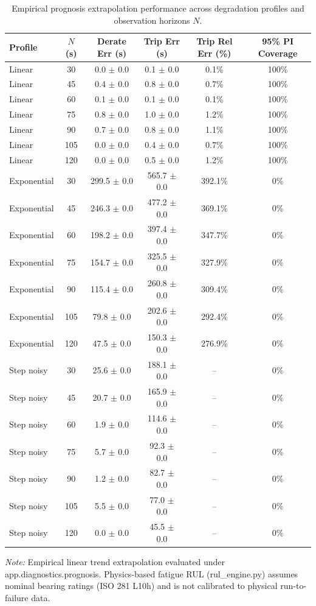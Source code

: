 \begin{table}[t]
\centering
\small
\caption{Empirical prognosis extrapolation performance across degradation profiles and observation horizons $N$.}
\label{tab:prognosis_evaluation}
\begin{tabular}{lccccc}
\toprule
\textbf{Profile} & \textbf{$N$ (s)} & \textbf{Derate Err (s)} & \textbf{Trip Err (s)} & \textbf{Trip Rel Err (\%)} & \textbf{95\% PI Coverage} \\
\midrule
Linear & 30 & 0.0 $\pm$ 0.0 & 0.1 $\pm$ 0.0 & 0.1\% & 100\% \\
Linear & 45 & 0.4 $\pm$ 0.0 & 0.8 $\pm$ 0.0 & 0.7\% & 100\% \\
Linear & 60 & 0.1 $\pm$ 0.0 & 0.1 $\pm$ 0.0 & 0.1\% & 100\% \\
Linear & 75 & 0.8 $\pm$ 0.0 & 1.0 $\pm$ 0.0 & 1.2\% & 100\% \\
Linear & 90 & 0.7 $\pm$ 0.0 & 0.8 $\pm$ 0.0 & 1.1\% & 100\% \\
Linear & 105 & 0.0 $\pm$ 0.0 & 0.4 $\pm$ 0.0 & 0.7\% & 100\% \\
Linear & 120 & 0.0 $\pm$ 0.0 & 0.5 $\pm$ 0.0 & 1.2\% & 100\% \\
Exponential & 30 & 299.5 $\pm$ 0.0 & 565.7 $\pm$ 0.0 & 392.1\% & 0\% \\
Exponential & 45 & 246.3 $\pm$ 0.0 & 477.2 $\pm$ 0.0 & 369.1\% & 0\% \\
Exponential & 60 & 198.2 $\pm$ 0.0 & 397.4 $\pm$ 0.0 & 347.7\% & 0\% \\
Exponential & 75 & 154.7 $\pm$ 0.0 & 325.5 $\pm$ 0.0 & 327.9\% & 0\% \\
Exponential & 90 & 115.4 $\pm$ 0.0 & 260.8 $\pm$ 0.0 & 309.4\% & 0\% \\
Exponential & 105 & 79.8 $\pm$ 0.0 & 202.6 $\pm$ 0.0 & 292.4\% & 0\% \\
Exponential & 120 & 47.5 $\pm$ 0.0 & 150.3 $\pm$ 0.0 & 276.9\% & 0\% \\
Step noisy & 30 & 25.6 $\pm$ 0.0 & 188.1 $\pm$ 0.0 & -- & 0\% \\
Step noisy & 45 & 20.7 $\pm$ 0.0 & 165.9 $\pm$ 0.0 & -- & 0\% \\
Step noisy & 60 & 1.9 $\pm$ 0.0 & 114.6 $\pm$ 0.0 & -- & 0\% \\
Step noisy & 75 & 5.7 $\pm$ 0.0 & 92.3 $\pm$ 0.0 & -- & 0\% \\
Step noisy & 90 & 1.2 $\pm$ 0.0 & 82.7 $\pm$ 0.0 & -- & 0\% \\
Step noisy & 105 & 5.5 $\pm$ 0.0 & 77.0 $\pm$ 0.0 & -- & 0\% \\
Step noisy & 120 & 0.0 $\pm$ 0.0 & 45.5 $\pm$ 0.0 & -- & 0\% \\
\bottomrule
\end{tabular}
\begin{tablenotes}
\small
\item \textit{Note:} Empirical linear trend extrapolation evaluated under app.diagnostics.prognosis.
Physics-based fatigue RUL (rul\_engine.py) assumes nominal bearing ratings (ISO 281 L10h) and is not calibrated to physical run-to-failure data.
\end{tablenotes}
\end{table}
